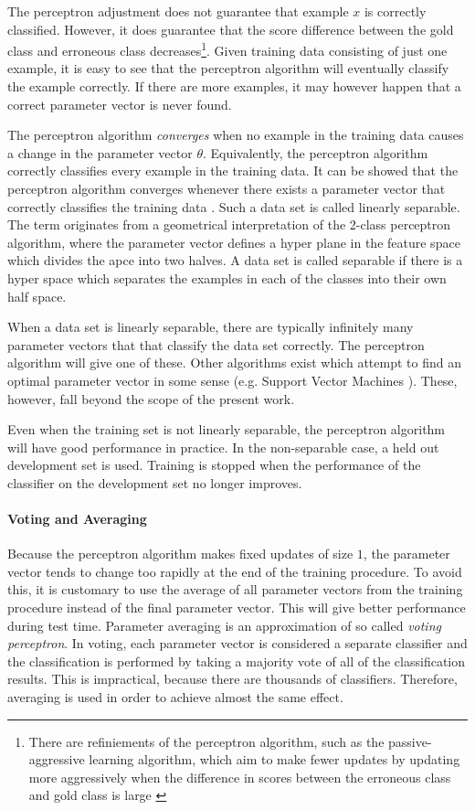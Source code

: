 The perceptron adjustment does not guarantee that example $x$ is
correctly classified. However, it does guarantee that the score
difference between the gold class and erroneous class decreases\footnote{There are refiniements of the perceptron algorithm, such as the passive-aggressive learning algorithm, which aim to make fewer updates by updating more aggressively when the difference in scores between the erroneous class and gold class is large \citep{Crammer2006}}. Given
training data consisting of just one example, it is easy to see that
the perceptron algorithm will eventually classify the example
correctly. If there are more examples, it may however happen that a
correct parameter vector is never found.

The perceptron algorithm {\it converges} when no example in the
training data causes a change in the parameter vector
$\theta$. Equivalently, the perceptron algorithm correctly classifies
every example in the training data. It can be showed that the
perceptron algorithm converges whenever there exists a parameter vector
that correctly classifies the training data \citep{Freund1999}. Such a
data set is called linearly separable. The term originates from a
geometrical interpretation of the 2-class perceptron algorithm, where
the parameter vector defines a hyper plane in the feature space which
divides the apce into two halves. A data set is called separable if
there is a hyper space which separates the examples in each of the
classes into their own half space.

When a data set is linearly separable, there are typically infinitely
many parameter vectors that that classify the data set correctly. The
perceptron algorithm will give one of these. Other algorithms exist
which attempt to find an optimal parameter vector in some sense
(e.g. Support Vector Machines \citep{Cortes1995}). These, however,
fall beyond the scope of the present work.

Even when the training set is not linearly separable, the perceptron
algorithm will have good performance in practice. In the non-separable
case, a held out development set is used. Training is stopped when the
performance of the classifier on the development set no longer
improves.

\paragraph{Voting and Averaging} Because the perceptron algorithm
makes fixed updates of size $1$, the parameter vector tends to change
too rapidly at the end of the training procedure. To avoid this, it is
customary to use the average of all parameter vectors from the
training procedure instead of the final parameter vector. This will
give better performance during test time. Parameter averaging is an
approximation of so called {\it voting perceptron}. In voting, each
parameter vector is considered a separate classifier and the
classification is performed by taking a majority vote of all of the
classification results. This is impractical, because there are
thousands of classifiers. Therefore, averaging is used in order to
achieve almost the same effect.

